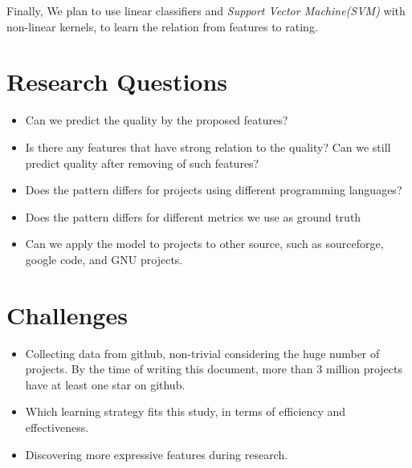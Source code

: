 \documentclass[11pt]{article}
\begin{document}
Finally, We plan to use linear classifiers and \emph{Support Vector Machine(SVM)} with non-linear kernels,
to learn the relation from features to rating.

\section{Research Questions}
\label{sec:orgheadline3}
\begin{itemize}
\item Can we predict the quality by the proposed features?
\item Is there any features that have strong relation to the quality? Can we still predict quality after removing of such features?
\item Does the pattern differs for projects using different programming languages?
\item Does the pattern differs for different metrics we use as ground truth
\item Can we apply the model to projects to other source, such as sourceforge, google code, and GNU projects.
\end{itemize}

\section{Challenges}
\label{sec:orgheadline4}
\begin{itemize}
\item Collecting data from github, non-trivial considering the huge number of projects. By the time of writing this document, more than 3 million projects have at least one star on github.
\item Which learning strategy fits this study, in terms of efficiency and effectiveness.
\item Discovering more expressive features during research.
\end{itemize}
\end{document}
